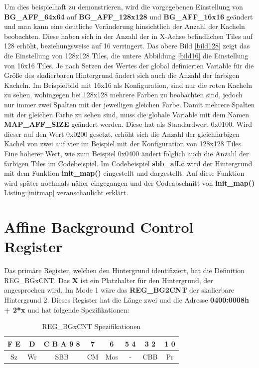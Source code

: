 Um dies beispielhaft zu demonstrieren, wird die vorgegebenen Einstellung von \textbf{BG\_AFF\_64x64} auf \textbf{BG\_AFF\_128x128} und \textbf{BG\_AFF\_16x16 }geändert und man kann eine deutliche Veränderung hinsichtlich der Anzahl der Kacheln beobachten. Diese haben sich in der Anzahl der in X-Achse befindlichen Tiles auf 128 erhöht, beziehungsweise auf 16 verringert. Das obere Bild \ref{bild128} zeigt das die Einstellung von 128x128 Tiles, die untere Abbildung \ref{bild16} die Einstellung von 16x16 Tiles. Je nach Setzen des Wertes der global definierten Variable für die Größe des skalierbaren Hintergrund ändert sich auch die Anzahl der farbigen Kacheln. Im Beispielbild mit 16x16 als Konfiguration, sind nur die roten Kacheln zu sehen, wohingegen bei 128x128 mehrere Farben zu beobachten sind, jedoch nur immer zwei Spalten mit der jeweiligen gleichen Farbe. Damit mehrere Spalten mit der gleichen Farbe zu sehen sind, muss die globale Variable mit dem Namen \textbf{MAP\_AFF\_SIZE} geändert werden. Diese hat als Standardwert 0x0100. Wird dieser auf den Wert 0x0200 gesetzt, erhöht sich die Anzahl der gleichfarbigen Kachel von zwei auf vier im Beispiel mit der Konfiguration von 128x128 Tiles. Eine höherer Wert, wie zum Beispiel 0x0400 ändert folglich auch die Anzahl der farbigen Tiles im Codebeispiel. Im Codebeispiel \textbf{sbb\_aff.c} wird der Hintergrund mit dem Funktion \textbf{init\_map()} eingestellt und dargestellt. Auf diese Funktion wird später nochmals näher eingegangen und der Codeabschnitt von \textbf{init\_map()} Listing:\ref{initmap} veranschaulicht erklärt. \citep{affine}

\section{Affine Background Control Register}
Das primäre Register, welchen den Hintergrund identifiziert, hat die Definition REG\_BGxCNT. Das \textbf{X} ist ein Platzhalter für den Hintergrund, der angesprochen wird. Im Mode 1 wäre das \textbf{REG\_BG2CNT} der skalierbare Hintergrund 2. Dieses Register hat die Länge zwei und die Adresse \textbf{ 0400:0008h + 2*x} und hat folgende Spezifikationen:
\begin{table}[ht]
\centering
\begin{tabular}{|c|c|c|c|c|c|c|c|}
\hline
\textbf{F E} & \textbf{D} & \textbf{C B A 9 8} & \textbf{7} & \textbf{6} & \textbf{5 4} & \textbf{3 2} & \textbf{1 0} \\ \hline
Sz & Wr & SBB & CM & Mos & - & CBB & Pr \\ \hline
\end{tabular}
\caption{REG\_BGxCNT Spezifikationen}
\label{regspec}
\end{table}

